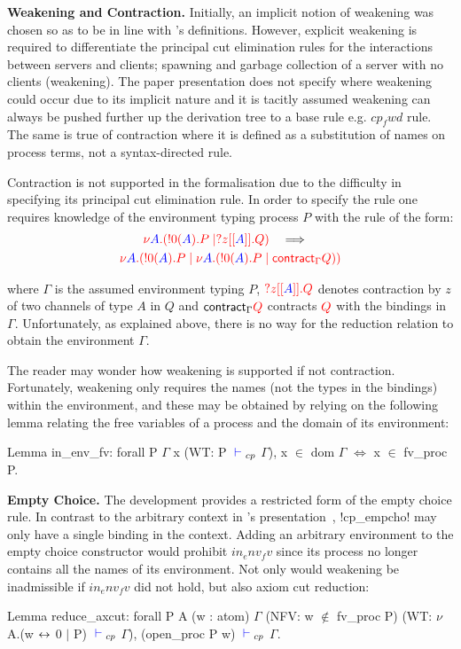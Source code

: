 \textbf{Weakening and Contraction.} Initially, an implicit notion of weakening
was chosen so as to be in line with \citeauthor{Wadler:2014}'s
definitions. However, explicit weakening is required to differentiate the
principal cut elimination rules for the interactions between servers and
clients; spawning and garbage collection of a server with no clients
(weakening). The paper presentation does not specify where weakening could
occur due to its implicit nature and it is tacitly assumed weakening can
always be pushed further up the derivation tree to a base rule
e.g. \coqe$cp_fwd$ rule. The same is true of contraction where it is defined
as a substitution of names on process terms, not a syntax-directed rule.

\begin{samepage}
Contraction is not supported in the formalisation due to the difficulty in
specifying its principal cut elimination rule.  In order to specify the rule
one requires knowledge of the environment typing process \coqe$P$ with the
rule of the form:
\begin{gather*}
\colored
\tm{\nu \tp{A}.(!0(\tp{A}).P \mid ?z[[\tp{A}]].Q)}
\quad \becomes \quad \\
\colored
\tm{\nu \tp{A}.(!0(\tp{A}).P \mid \nu
                \tp{A}.(!0(\tp{A}).P \mid \key{contract}_{\Gamma} Q))}
\end{gather*}

where $\Gamma$ is the assumed environment typing $P$,
$\colored\tm{?z[[\tp{A}]].Q}$ denotes contraction by $z$ of two channels of
type $A$ in $Q$ and $\textsf{contract}_{\Gamma} {\color{red} Q}$ contracts ${\color{red} Q}$ with
the bindings in $\Gamma$. Unfortunately, as explained above, there is no way
for the reduction relation to obtain the environment $\Gamma$.
\end{samepage}

The reader may wonder how weakening is supported if not
contraction. Fortunately, weakening only requires the names (not the types in
the bindings) within the environment, and these may be obtained by relying on
the following lemma relating the free variables of a process and the domain of
its environment:
\begin{coq}
Lemma in_env_fv:
  forall P $\Gamma$ x (WT: P ${\color{blue} {} \vdash {}}_{cp}$ $\Gamma$),
    x $\in$ dom $\Gamma$ $\iff$ x $\in$ fv_proc P.
\end{coq}

\textbf{Empty Choice.} The development provides a restricted form of the empty
choice rule. In contrast to the arbitrary context in
\citeauthor{Wadler:2014}'s presentation~\cite{Wadler:2014}, \coqe!cp_empcho!
may only have a single binding in the context. Adding an arbitrary environment
to the empty choice constructor would prohibit \coqe$in_env_fv$ since its
process no longer contains all the names of its environment. Not only would
weakening be inadmissible if \coqe$in_env_fv$ did not hold, but also axiom cut
reduction:
\begin{coq}
Lemma reduce_axcut:
  forall P A (w : atom) $\Gamma$
         (NFV: w $\notin$ fv_proc P)
         (WT: $\nu$ A.(w ${\leftrightarrow}$ 0 $\mid$ P) ${\color{blue} {} \vdash {}}_{cp}$ $\Gamma$),
    (open_proc P w) ${\color{blue} {} \vdash {}}_{cp}$ $\Gamma$.
\end{coq}

